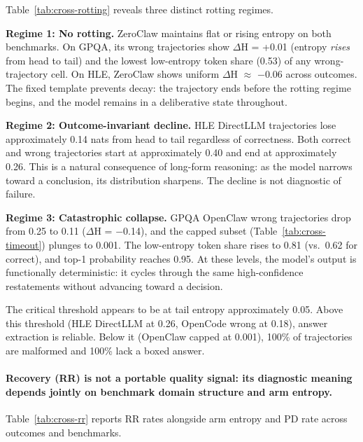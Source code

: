 Table~\ref{tab:cross-rotting} reveals three distinct rotting regimes.

\textbf{Regime 1: No rotting.}
ZeroClaw maintains flat or rising entropy on both benchmarks.
On GPQA, its wrong trajectories show $\Delta$H = +0.01 (entropy \emph{rises}
from head to tail) and the lowest low-entropy token share (0.53) of any
wrong-trajectory cell.
On HLE, ZeroClaw shows uniform $\Delta$H $\approx$ $-$0.06 across outcomes.
The fixed template prevents decay: the trajectory ends before the rotting
regime begins, and the model remains in a deliberative state throughout.

\textbf{Regime 2: Outcome-invariant decline.}
HLE DirectLLM trajectories lose approximately 0.14 nats from head to tail
regardless of correctness.
Both correct and wrong trajectories start at approximately 0.40 and end at
approximately 0.26.
This is a natural consequence of long-form reasoning: as the model narrows
toward a conclusion, its distribution sharpens.
The decline is not diagnostic of failure.

\textbf{Regime 3: Catastrophic collapse.}
GPQA OpenClaw wrong trajectories drop from 0.25 to 0.11 ($\Delta$H = $-$0.14),
and the capped subset (Table~\ref{tab:cross-timeout}) plunges to 0.001.
The low-entropy token share rises to 0.81 (vs.\ 0.62 for correct), and top-1
probability reaches 0.95.
At these levels, the model's output is functionally deterministic: it cycles
through the same high-confidence restatements without advancing toward a
decision.

The critical threshold appears to be at tail entropy approximately 0.05.
Above this threshold (HLE DirectLLM at 0.26, OpenCode wrong at 0.18),
answer extraction is reliable.
Below it (OpenClaw capped at 0.001), 100\% of trajectories are malformed
and 100\% lack a boxed answer.

\paragraph{Recovery (RR) is not a portable quality signal: its diagnostic
meaning depends jointly on benchmark domain structure and arm entropy.}

Table~\ref{tab:cross-rr} reports RR rates alongside arm entropy and PD rate
across outcomes and benchmarks.

